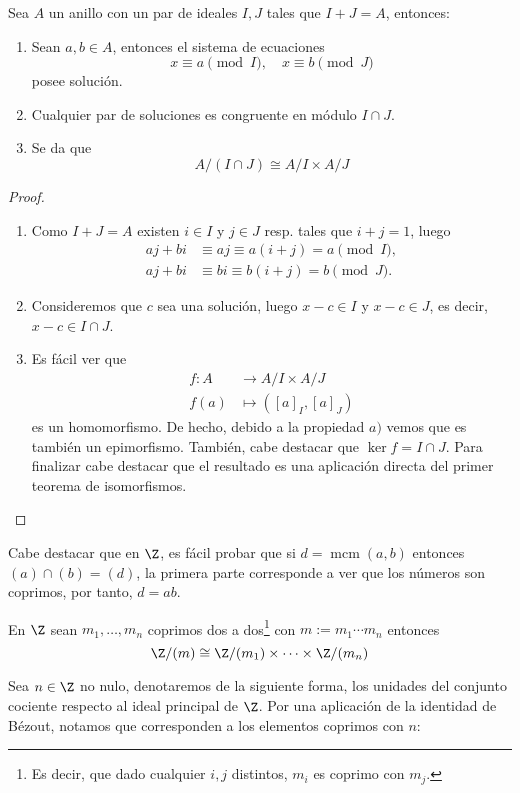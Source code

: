 \documentclass[11pt,oneside]{book}
\DeclareMathOperator{\mcm}{mcm}
\begin{document}
\begin{thm}
Sea $A$ un anillo con un par de ideales $I,J$ tales que $I+J=A$, entonces:
\begin{enumerate}[$a)$]
	\item Sean $a,b\in A$, entonces el sistema de ecuaciones
	$$x\equiv a\pmod I,\quad x\equiv b\pmod J$$
	posee solución.
	\item Cualquier par de soluciones es congruente en módulo $I\cap J$.
	\item Se da que
	$$A/(I\cap J)\cong A/I\times A/J$$
\end{enumerate}
\end{thm}
\begin{proof}
\begin{enumerate}[$a)$]
	\item Como $I+J=A$ existen $i\in I$ y $j\in J$ resp. tales que $i+j=1$, luego
	\begin{align*}
	aj+bi&\equiv aj\equiv a(i+j)=a\pmod I,\\
	aj+bi&\equiv bi\equiv b(i+j)=b\pmod J.
	\end{align*}
	\item Consideremos que $c$ sea una solución, luego $x-c\in I$ y $x-c\in J$, es decir, $x-c\in I\cap J$.
	\item Es fácil ver que
	\begin{align*}
	f:A&\longrightarrow A/I\times A/J\\
	f(a)&\longmapsto ([a]_I, [a]_J)
	\end{align*}
	es un homomorfismo. De hecho, debido a la propiedad $a)$ vemos que es también un epimorfismo. También, cabe destacar que $\ker f=I\cap J$. Para finalizar cabe destacar que el resultado es una aplicación directa del primer teorema de isomorfismos.
\end{enumerate}
\end{proof}
Cabe destacar que en $\Z$, es fácil probar que si $d=\mcm(a,b)$ entonces $(a)\cap(b)=(d)$, la primera parte corresponde a ver que los números son coprimos, por tanto, $d=ab$.
\begin{cor}
En $\Z$ sean $m_1,\dots,m_n$ coprimos dos a dos\footnote{Es decir, que dado cualquier $i,j$ distintos, $m_i$ es coprimo con $m_j$.} con $m:=m_1\cdots m_n$ entonces
$$\Z/(m)\cong\Z/(m_1)\times\cdots\times\Z/(m_n)$$
\end{cor}
Sea $n\in\Z$ no nulo, denotaremos de la siguiente forma, los unidades del conjunto cociente respecto al ideal principal de $\Z$. Por una aplicación de la identidad de Bézout, notamos que corresponden a los elementos coprimos con $n$:
\end{document}
